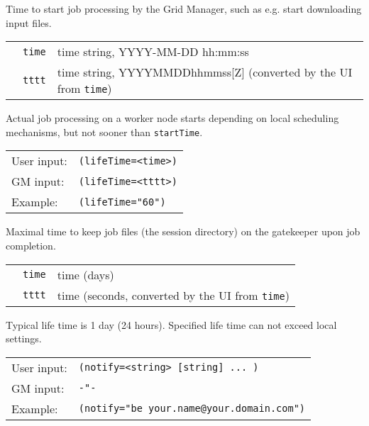   Time to start job processing by the Grid Manager, such as e.g. start downloading input files.

  \begin{tabular}{llp{10cm}}
    \hspace*{1cm}&\texttt{time} & time string, YYYY-MM-DD hh:mm:ss\\ 
    \hspace*{1cm}&\texttt{tttt} & time string, YYYYMMDDhhmmss[Z] (converted by the UI from
    \texttt{time})\\
  \end{tabular}
  
  \begin{framed}
   Actual job processing on a worker node starts depending on local scheduling mechanisms, but not sooner than \texttt{startTime}. 
   \end{framed}

  \hspace*{0.5cm}
  \begin{shaded}
  \end{shaded}
  \begin{tabular}{lp{13cm}}
    User input:&\verb#(lifeTime=<time>)#\\
    GM input:&\verb#(lifeTime=<tttt>)#\\
    Example:&\verb#(lifeTime="60")#\\
  \end{tabular}

  Maximal time to keep job files (the session directory) on the
  gatekeeper upon job completion.

  \begin{tabular}{llp{10cm}}
    \hspace*{1cm}&\texttt{time} & time (days)\\
    \hspace*{1cm}&\texttt{tttt} & time (seconds, converted by the UI from \texttt{time})\\
  \end{tabular}

  Typical life time is 1 day (24 hours). Specified life time can not
  exceed local settings.

  \hspace*{0.5cm}
  \begin{shaded}
  \end{shaded}
  \begin{tabular}{lp{13cm}}
    User input:&\verb#(notify=<string> [string] ... )#\\
    GM input:&\verb#-"-#\\
    Example:&\verb#(notify="be your.name@your.domain.com")#\\
  \end{tabular}

